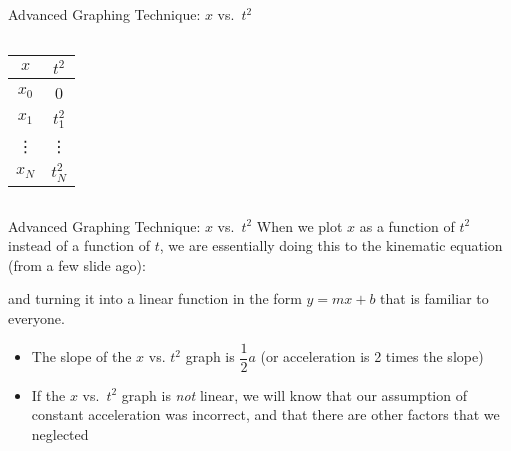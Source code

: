 \documentclass[12pt,compress,aspectratio=169,dvipsnames]{beamer}
\begin{document}
\begin{frame}{Advanced Graphing Technique: $x$ vs.\ $t^2$}
\begin{columns}[T]
{      \begin{tabular}{c|c}
        $x$ & $t^2$ \\\hline
        $x_0$ & 0 \\
        $x_1$ & $t_1^2$\\
        \vdots & \vdots \\
        $x_N$ & $t_N^2$
      \end{tabular}
      \hspace{.2in}
      \begin{minipage}{.4\textwidth}
      \end{minipage}
    }
  \end{columns}
\end{frame}



\begin{frame}{Advanced Graphing Technique: $x$ vs.\ $t^2$}
  When we plot $x$ as a function of $t^2$ instead of a function of $t$, we are
  essentially doing this to the kinematic equation (from a few slide ago):

  
  \vspace{-.05in}and turning it into a linear function in the form $y=mx+b$
  that is familiar to everyone.
  \begin{itemize}
  \item The slope of the $x$ vs. $t^2$ graph is $\dfrac12a$ (or acceleration
    is 2 times the slope)
  \item If the $x$ vs.\ $t^2$ graph is \emph{not} linear, we will know that
    our assumption of constant acceleration was incorrect, and that there are
    other factors that we neglected
  \end{itemize}
\end{frame}
\end{document}
